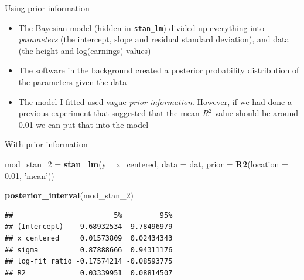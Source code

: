 \documentclass[ignorenonframetext,]{beamer}
\newenvironment{Shaded}{\begin{snugshade}}{\end{snugshade}}
\newcommand{\KeywordTok}[1]{\textcolor[rgb]{0.13,0.29,0.53}{\textbf{#1}}}
\newcommand{\DataTypeTok}[1]{\textcolor[rgb]{0.13,0.29,0.53}{#1}}
\newcommand{\DecValTok}[1]{\textcolor[rgb]{0.00,0.00,0.81}{#1}}
\newcommand{\FloatTok}[1]{\textcolor[rgb]{0.00,0.00,0.81}{#1}}
\newcommand{\StringTok}[1]{\textcolor[rgb]{0.31,0.60,0.02}{#1}}
\newcommand{\OperatorTok}[1]{\textcolor[rgb]{0.81,0.36,0.00}{\textbf{#1}}}
\newcommand{\NormalTok}[1]{#1}
\providecommand{\tightlist}{%
  \setlength{\itemsep}{0pt}\setlength{\parskip}{0pt}}
\begin{document}
\begin{frame}[fragile]{Using prior information}

\begin{itemize}
\tightlist
\item
  The Bayesian model (hidden in \texttt{stan\_lm}) divided up everything
  into \emph{parameters} (the intercept, slope and residual standard
  deviation), and data (the height and log(earnings) values)
\item
  The software in the background created a posterior probability
  distribution of the parameters given the data
\item
  The model I fitted used vague \emph{prior information}. However, if we
  had done a previous experiment that suggested that the mean \(R^2\)
  value should be around 0.01 we can put that into the model
\end{itemize}

\end{frame}

\begin{frame}[fragile]{With prior information}

\begin{Shaded}
\begin{Highlighting}[]
\NormalTok{mod_stan_}\DecValTok{2}\NormalTok{ =}\StringTok{ }\KeywordTok{stan_lm}\NormalTok{(y }\OperatorTok{~}\StringTok{ }\NormalTok{x_centered, }\DataTypeTok{data =}\NormalTok{ dat,}
               \DataTypeTok{prior =} \KeywordTok{R2}\NormalTok{(}\DataTypeTok{location =} \FloatTok{0.01}\NormalTok{, }\StringTok{'mean'}\NormalTok{))}
\end{Highlighting}
\end{Shaded}

\begin{Shaded}
\begin{Highlighting}[]
\KeywordTok{posterior_interval}\NormalTok{(mod_stan_}\DecValTok{2}\NormalTok{)}
\end{Highlighting}
\end{Shaded}

\begin{verbatim}
##                        5%         95%
## (Intercept)    9.68932534  9.78496979
## x_centered     0.01573809  0.02434343
## sigma          0.87888666  0.94311176
## log-fit_ratio -0.17574214 -0.08593775
## R2             0.03339951  0.08814507
\end{verbatim}

\end{frame}
\end{document}
